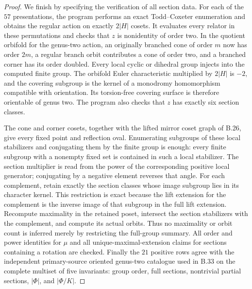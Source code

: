 \begin{proof}
We finish by specifying the verification of all section data.
For each of the $57$ presentations, the program performs an exact
Todd--Coxeter enumeration and obtains the regular action on exactly
$2|H|$ cosets.  It evaluates every relator in these permutations and
checks that $z$ is nonidentity of order two.  In the quotient orbifold
for the genus-two action, an originally branched cone of order $m$
now has order $2m$, a regular branch orbit contributes a cone of
order two, and a branched corner has its order doubled.  Every
local cyclic or dihedral group injects into the computed finite
group.  The orbifold Euler characteristic multiplied by $2|H|$
is $-2$, and the covering subgroup is the kernel of a
monodromy homomorphism compatible with orientation.  Its torsion-free
covering surface is therefore orientable of genus two.
The program also checks that $z$ has exactly six section classes.

The cone and corner cosets, together with the lifted mirror coset
graph of B.26, give every fixed point and reflection oval.  Enumerating
subgroups of these local stabilizers and conjugating them by the
finite group is enough: every finite subgroup with a nonempty fixed
set is contained in such a local stabilizer.  The section multiplier
is read from the power of the corresponding positive local generator;
conjugating by a negative element reverses that angle.  For each
complement, retain exactly the section classes whose image subgroup
lies in its character kernel.  This restriction is exact because
the lift extension for the complement is the inverse image of that
subgroup in the full lift extension.  Recompute maximality in the
retained poset, intersect the section stabilizers with the complement,
and compute its actual orbits.  Thus no maximality or orbit count is
inferred merely by restricting the full-group summary.
All order and power identities for $\mu$ and all unique-maximal-extension
claims for sections containing a rotation are checked.  Finally the
$21$ positive rows agree with the independent primary-source
oriented genus-two catalogue used in B.33 on the complete multiset
of five invariants: group order, full sections, nontrivial partial
sections, $|\Phi|$, and $|\Phi/K|$.
\end{proof}
